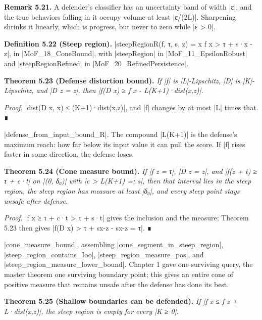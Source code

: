 \documentclass{memoir}
\begin{document}
\textbf{Remark 5.21.} A defender's classifier has an uncertainty band of width \LeanVerb|ε|, and the true
behaviors falling in it occupy volume at least \LeanVerb|ε/(2L)|. Sharpening shrinks it
linearly, which is progress, but never to zero while \LeanVerb|ε > 0|.

\textbf{Definition 5.22 (Steep region).} \LeanVerb|steepRegionR(f, τ, s, z) = x  f x > τ + s·x - z|,
in \LeanVerb|MoF_18_ConeBound|, with \LeanVerb|steepRegion| in \LeanVerb|MoF_11_EpsilonRobust| and
\LeanVerb|steepRegionRefined| in \LeanVerb|MoF_20_RefinedPersistence|.

\textbf{Theorem 5.23 (Defense distortion bound).} \emph{If \LeanVerb|f| is \LeanVerb|L|-Lipschitz, \LeanVerb|D| is
\LeanVerb|K|-Lipschitz, and \LeanVerb|D z = z|, then \LeanVerb|f(D x) ≥ f x - L(K+1)·dist(x,z)|.}

\emph{Proof.} \LeanVerb|dist(D x, x) ≤ (K+1)·dist(x,z)|, and \LeanVerb|f| changes by at most \LeanVerb|L| times that. ∎

\LeanVerb|defense_from_input_bound_R|. The compound \LeanVerb|L(K+1)| is the defense's maximum
reach: how far below its input value it can pull the score. If \LeanVerb|f| rises faster
in some direction, the defense loses.

\textbf{Theorem 5.24 (Cone measure bound).} \emph{If \LeanVerb|f z = τ|, \LeanVerb|D z = z|, and \LeanVerb|f(z + t) ≥ τ + c·t|
on \LeanVerb|(0, δ₀)| with \LeanVerb|c > L(K+1) =: s|, then that interval lies in the steep
region, the steep region has measure at least \LeanVerb|δ₀|, and every steep point stays
unsafe after defense.}

\emph{Proof.} \LeanVerb|f x ≥ τ + c·t > τ + s·t| gives the inclusion and the measure; Theorem 5.23 then
gives \LeanVerb|f(D x) > τ + sx-z - sx-z = τ|. ∎

\LeanVerb|cone_measure_bound|, assembling \LeanVerb|cone_segment_in_steep_region|,
\LeanVerb|steep_region_contains_Ioo|, \LeanVerb|steep_region_measure_pos|, and
\LeanVerb|steep_region_measure_lower_bound|. Chapter 1 gave one surviving query, the
master theorem one surviving boundary point; this gives an entire cone of
positive measure that remains unsafe after the defense has done its best.

\textbf{Theorem 5.25 (Shallow boundaries can be defended).} \emph{If \LeanVerb|f x ≤ f z + L·dist(x,z)|, the
steep region is empty for every \LeanVerb|K ≥ 0|.}
\end{document}
